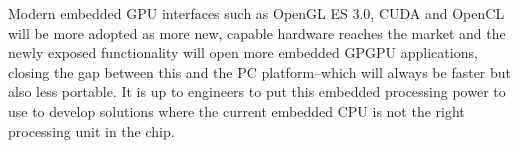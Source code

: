 \documentclass[conference]{IEEEtran}
\begin{document}
Modern embedded GPU interfaces such as OpenGL ES 3.0, CUDA and OpenCL will be more adopted as more new, capable hardware reaches the market and the newly exposed functionality will open more embedded GPGPU applications, closing the gap between this and the PC platform--which will always be faster but also less portable. It is up to engineers to put this embedded processing power to use to develop solutions where the current embedded CPU is not the right processing unit in the chip.





\end{document}
